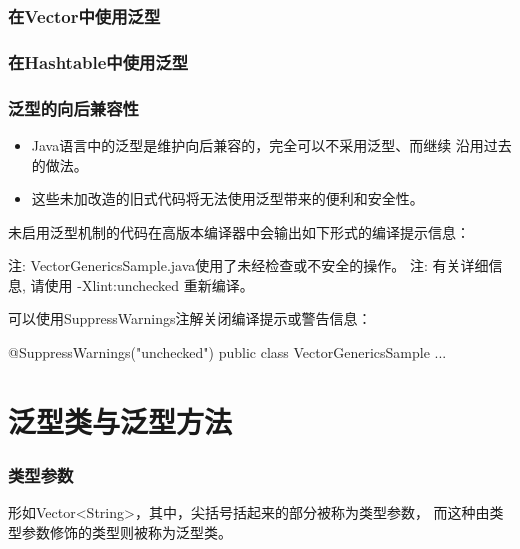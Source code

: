 \subsubsection{在Vector中使用泛型}

  
\subsubsection{在Hashtable中使用泛型}


\subsubsection{泛型的向后兼容性}

\begin{itemize}
\item Java语言中的泛型是维护向后兼容的，完全可以不采用泛型、而继续
  沿用过去的做法。
\item 这些未加改造的旧式代码将无法使用泛型带来的便利和安全性。
\end{itemize}

未启用泛型机制的代码在高版本编译器中会输出如下形式的编译提示信息：

\begin{stdoutCode}
  注: VectorGenericsSample.java使用了未经检查或不安全的操作。
  注: 有关详细信息, 请使用 -Xlint:unchecked 重新编译。
\end{stdoutCode}

可以使用SuppressWarnings注解关闭编译提示或警告信息：

\begin{javaCode}
  @SuppressWarnings({"unchecked"})  
  public class VectorGenericsSample {
    ...
  }
\end{javaCode}


\section{泛型类与泛型方法}

\subsubsection{类型参数}


形如Vector<String>，其中，尖括号括起来的部分被称为{\Red\hei 类型参数}，
而这种由类型参数修饰的类型则被称为{\Blue\hei 泛型类}。

